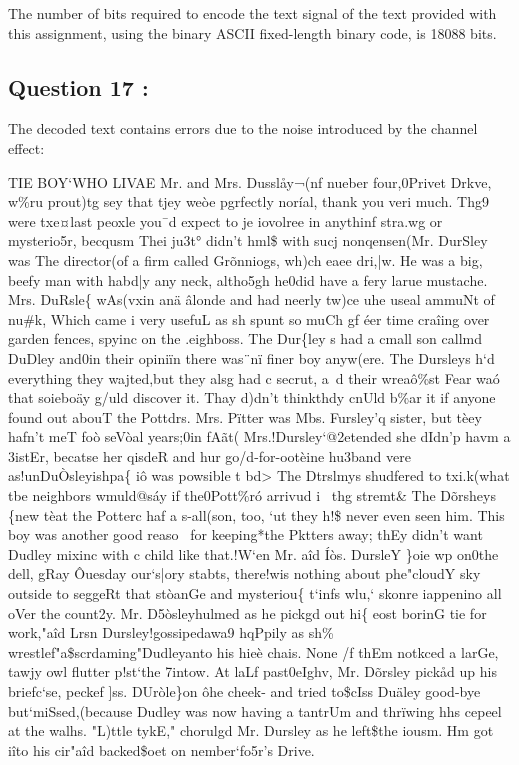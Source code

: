 \documentclass[titlepage]{article}
\begin{document}
The number of bits required to encode the text signal of the text provided with this assignment, using the binary ASCII fixed-length binary code, is 18088 bits.

\subsection{Question 17 : }

The decoded text contains errors due to the noise introduced by the channel effect: 

\begin{displayquote}
    TIE BOY`WHO LIVAE Mr. and Mrs. Dusslåy¬(nf nueber four,0Privet Drkve, w\%ru prout)tg sey that tjey weòe pgrfectly noríal, thank you veri much. Thg9 were txe¤last peoxle you¯d expect to je iovolree in anythinf stra.wg or mysterio5r, becqusm Thei ju3t° didn't hml\$ with sucj nonqensen(Mr. DurSley was The director(of a firm called Grõnniogs, wh)ch eaee dri,|w. He was a big, beefy man with habd|y any neck, altho5gh he0did have a fery larue mustache. Mrs. DuRsle\{ wAs(vxin anä âlonde and had neerly tw)ce uhe useal ammuNt of nu\#k, Which came i very usefuL as sh spunt so muCh gf éer time craîing over garden fences, spyinc on the .eighboss. The Dur\{ley s had a cmall son callmd DuDley and0in their opiniïn there was¨nï finer boy anyw(ere. The Dursleys h`d everything they wajted,but they alsg had c secrut, a~d their wreaô\%st Fear waó that soieboäy g/uld discover it. Thay d)dn't thinkthdy cnUld b\%ar it if anyone found out abouT the Pottdrs. Mrs. Pïtter was Mbs. Fursley'q sister, but tèey hafn't meT foò seVòal years;0in fAãt( Mrs.!Dursley`@2etended she dIdn'p havm a 3istEr, becatse her qisdeR and hur go/d-for-ootèine hu3band vere as!unDuÒsleyishpa\{ iô was powsible t bd> The Dtrslmys shudfered to txi.k(what tbe neighbors wmuld@sáy if the0Pott\%ró arrivud i~ thg stremt\& The Dõrsheys \{new tèat the Potterc haf a s-all(son, too, `ut they h!\$ never even seen him. This boy was another good reaso~ for keeping*the Pktters away; thEy didn't want Dudley mixinc with c child like that.!W`en Mr. aîd Íòs. DursleY \}oie wp on0the dell, gRay Ôuesday our`s|ory stabts, there!wis nothing about phe"cloudY sky outside to seggeRt that stòanGe and mysteriou\{ t`infs wlu,` skonre iappenino all oVer the count2y. Mr. D5òsleyhulmed as he pickgd out hi\{ eost borinG tie for work,"aîd Lrsn Dursley!gossipedawa9 hqPpily as sh\% wrestlef"a\$scrdaming"Dudleyanto his hieè chais. None /f thEm notkced a larGe, tawjy owl flutter p!st`the 7intow. At laLf past0eIghv, Mr. Dõrsley pickåd up his briefc`se, peckef ]ss. DUròle\}on ôhe cheek- and tried to\$cIss Duäley good-bye but`miSsed,(because Dudley was now having a tantrUm and thrïwing hhs cepeel at the walhs. "L)ttle tykE," chorulgd Mr. Dursley as he left\$the iousm. Hm got iîto his cir"aîd backed\$oet on nember`fo5r's Drive. 
\end{displayquote}
\end{document}
